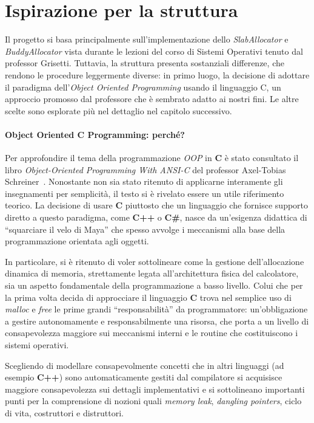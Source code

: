 \section{Ispirazione per la struttura}
Il progetto si basa principalmente sull’implementazione dello \textit{SlabAllocator} e \textit{BuddyAllocator} vista durante le lezioni del corso di Sistemi Operativi tenuto dal professor Grisetti. Tuttavia, la struttura presenta sostanziali differenze, che rendono le procedure leggermente diverse: in primo luogo, la decisione di adottare il paradigma dell'\textit{Object Oriented Programming} usando il linguaggio C, un approccio promosso dal professore che è sembrato adatto ai nostri fini. Le altre scelte sono esplorate più nel dettaglio nel capitolo successivo.

\paragraph{Object Oriented C Programming: perché?}

Per approfondire il tema della programmazione \textit{OOP} in \textbf{C} è stato consultato il libro \textit{Object-Oriented Programming With ANSI-C} del professor Axel-Tobias Schreiner~\cite{schreiner1994}. Nonostante non sia stato ritenuto di applicarne interamente gli insegnamenti per semplicità, il testo si è rivelato essere un utile riferimento teorico. La decisione di usare \textbf{C} piuttosto che un linguaggio che fornisce supporto diretto a questo paradigma, come \textbf{C++} o \textbf{C\#}, nasce da un’esigenza didattica di ``squarciare il velo di Maya'' che spesso avvolge i meccanismi alla base della programmazione orientata agli oggetti.

In particolare, si è ritenuto di voler sottolineare come la gestione dell’allocazione dinamica di memoria, strettamente legata all’architettura fisica del calcolatore, sia un aspetto fondamentale della programmazione a basso livello. Colui che per la prima volta decida di approcciare il linguaggio \textbf{C} trova nel semplice uso di \textit{malloc} e \textit{free} le prime grandi ``responsabilità'' da programmatore: un’obbligazione a gestire autonomamente e responsabilmente una risorsa, che porta a un livello di consapevolezza maggiore sui meccanismi interni e le routine che costituiscono i sistemi operativi.

Scegliendo di modellare consapevolmente concetti che in altri linguaggi (ad esempio \textbf{C++}) sono automaticamente gestiti dal compilatore si acquisisce maggiore consapevolezza sui dettagli implementativi e si sottolineano importanti punti per la comprensione di nozioni quali \textit{memory leak}, \textit{dangling pointers}, ciclo di vita, costruttori e distruttori.

